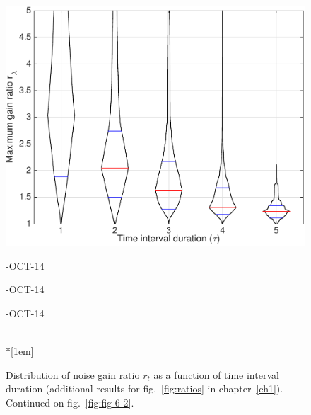 \begin{figure}
\includegraphics[width=\mylength]{dist/20141020-maxGain-local-relativePerf} \\
\parbox{\mylength}{-OCT-14}
\parbox{\mylength}{-OCT-14}
\parbox{\mylength}{-OCT-14} \\*[1em]
\caption[Distribution of noise gain ratio $r_t$]{Distribution of noise gain ratio $r_t$ as a function of time interval duration (additional results for fig.~\ref{fig:ratios} in chapter~\ref{ch1}). Continued on fig.~\ref{fig:fig-6-2}.}
\label{fig:fig-6-1}
\end{figure}

